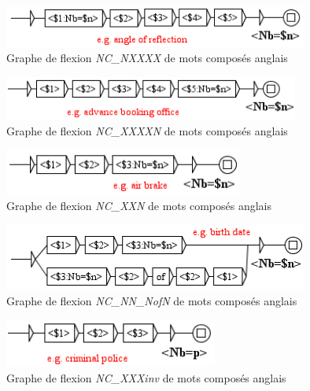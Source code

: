 \begin{figure}[!htb]
  \centering
  \includegraphics[width=10cm]{resources/img/NC'NXXXX'EN.png}
  \caption{Graphe de flexion \emph{NC\_NXXXX} de mots composés anglais}
  \label{fig:NC'NXXXX'EN}
\end{figure}

\begin{figure}[!htb]
  \centering
  \includegraphics[width=9.7cm]{resources/img/NC'XXXXN'EN.png}
  \caption{Graphe de flexion \emph{NC\_XXXXN} de mots composés anglais}
  \label{fig:NC'XXXXN'EN}
\end{figure}

\begin{figure}[!htb]
  \centering
  \includegraphics[width=7.8cm]{resources/img/NC'XXN'EN.png}
  \caption{Graphe de flexion \emph{NC\_XXN} de mots composés anglais}
  \label{fig:NC'XXN}
\end{figure}

\begin{figure}[!htb]
  \centering
  \includegraphics[width=10cm]{resources/img/NC'NN'NofN'EN.png}
  \caption{Graphe de flexion \emph{NC\_NN\_NofN} de mots composés anglais}
  \label{fig:NC'NN'NofN'EN}
\end{figure}

\begin{figure}[!htb]
  \centering
  \includegraphics[width=7cm]{resources/img/NC'XXXinv'EN.png}
  \caption{Graphe de flexion \emph{NC\_XXXinv} de mots composés anglais}
  \label{fig:NC'XXXinv'EN}
\end{figure}

